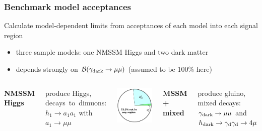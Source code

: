 \documentclass[compress]{beamer}
\newcommand{\s}[1]{{\mbox{\scriptsize #1}}}
\begin{document}
\begin{frame}
\frametitle{Benchmark model acceptances}

Calculate model-dependent limits from acceptances of each model into each signal region
\begin{itemize}
\item three sample models: one NMSSM Higgs and two dark matter
\item depends strongly on $\mathcal{B}(\gamma_\s{dark} \to \mu\mu)$ (assumed to be 100\% here)
\end{itemize}

\begin{columns}
{\bf NMSSM Higgs}

produce Higgs, \mbox{decays to dimuons:\hspace{-0.25 cm}} $h_1 \to a_1 a_1$ with $a_1 \to \mu\mu$

\includegraphics[width=\linewidth]{pie_NMSSM.pdf}

{\bf MSSM + mixed}

produce gluino, mixed decays: $\gamma_\s{dark} \to \mu\mu$ and \mbox{$h_\s{dark} \to \gamma_\s{d}\gamma_\s{d} \to 4\mu$\hspace{-1 cm}}


\end{columns}
\end{frame}
\end{document}
